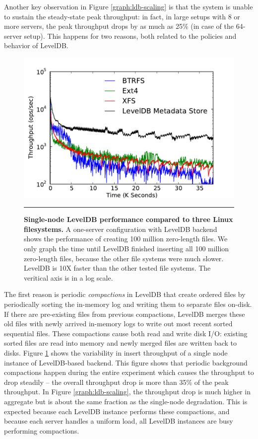 Another key observation in Figure \ref{graph:ldb-scaling} is that the system is
unable to sustain the steady-state peak throughput: in fact, in large setups
with 8 or more servers, the peak throughput drops by as much as 25\% (in case
of the 64-server setup). 
This happens for two reasons, both related to the policies and behavior of
LevelDB.

\begin{figure}[t]  %
\centerline{\includegraphics[scale=0.45]{./figs/ldb_insertrate_onenode}}
\caption{
\textbf{Single-node LevelDB performance compared to three Linux filesystems.}
{\small
A one-server configuration with LevelDB backend shows the performance of creating 100 million zero-length files.
We only graph the time until LevelDB finished inserting all 100 million zero-length files, 
because the other file systems were much slower. LevelDB is 10X faster than the other tested file systems.
The veritical axis is in a log scale.
}
}
\vspace{15pt}
\hrule 
\label{graph:ldb-singlenode}
\end{figure}       %

The first reason is periodic \textit{compactions} in LevelDB that create
ordered files 
by periodically sorting the in-memory log and writing them to separate files 
on-disk. If there are pre-existing files from previous compactions, LevelDB merges 
these old files with newly arrived in-memory logs to write out most recent sorted 
sequential files. These compactions cause both read and write disk I/O:
existing sorted files are read into memory and newly merged files are written
back to disks. Figure \ref{graph:ldb-singlenode} shows the variability in insert
throughput of a single node instance of LevelDB-based backend. This figure
shows that periodic background compactions happen during the entire experiment
which causes the throughput to drop steadily -- the overall throughput drop is
more than 35\% of the peak throughput.
In Figure \ref{graph:ldb-scaling}, the throughput drop is much higher in
aggregate but is about the same fraction as the single-node degradation.
This is expected because each LevelDB instance performs these compactions, and 
because each \giga{} server handles a uniform load, all LevelDB instances are busy
performing compactions.  

